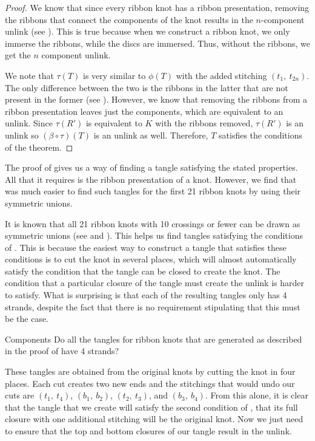 \begin{paper}
\begin{proof}
We know that since every ribbon knot has a ribbon presentation, removing the
ribbons that connect the components of the knot results in the $n$-component
unlink (see \figPresentation).
This is true because when we construct a ribbon knot, we only immerse the
ribbons, while the discs are immersed.
Thus, without the ribbons, we get the $n$ component unlink.

We note that $\tau(T)$ is very similar to $\phi(T)$ with the added stitching
$(t_1,~t_{2n})$.
The only difference between the two is the ribbons in the latter that are not
present in the former (see \figFinal).
However, we know that removing the ribbons from a ribbon presentation leaves
just the components, which are equivalent to an unlink.
Since $\tau(R')$ is equivalent to $K$ with the ribbons removed, $\tau(R')$ is an
unlink so $(\beta\circ\tau)(T)$ is an unlink as well.
Therefore, $T$ satisfies the conditions of the theorem.
\end{proof}


The proof of \thmRibbon gives us a way of finding a tangle satisfying the stated
properties.
All that it requires is the ribbon presentation of a knot.
However, we find that was much easier to find such tangles for the first 21
ribbon knots by using their symmetric unions.

It is known that all 21 ribbon knots with 10 crossings or fewer can be drawn as
symmetric unions (see \cite{many} and \cite{one}).
This helps us find tangles satisfying the conditions of \thmRibbon.
This is because the easiest way to construct a tangle that satisfies these
conditions is to cut the knot in several places, which will almost automatically
satisfy the condition that the tangle can be closed to create the knot.
The condition that a particular closure of the tangle must create the unlink is
harder to satisfy.
What is surprising is that each of the resulting tangles only has 4 strands,
despite the fact that there is no requirement stipulating that this must be the
case.

\begin{paperqtn}{Components}
Do all the tangles for ribbon knots that are generated as described in the proof
of \thmRibbon have 4 strands?
\end{paperqtn}

These tangles are obtained from the original knots by cutting the knot in four
places.
Each cut creates two new ends and the stitchings that would undo our cuts are
$(t_1,~t_4)$, $(b_1,~b_2)$, $(t_2,~t_3)$, and $(b_3,~b_4)$.
From this alone, it is clear that the tangle that we create will satisfy the
second condition of \thmRibbon, that its full closure with one additional
stitching will be the original knot.
Now we just need to ensure that the top and bottom closures of our tangle
result in the unlink.


\end{paper}
